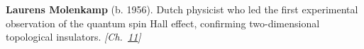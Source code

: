 \textbf{Laurens Molenkamp} (b. 1956). Dutch physicist who led the first experimental observation of the quantum spin Hall effect, confirming two-dimensional topological insulators. \emph{[Ch.~\hyperref[ch:topologicalinsulators]{11}]}

